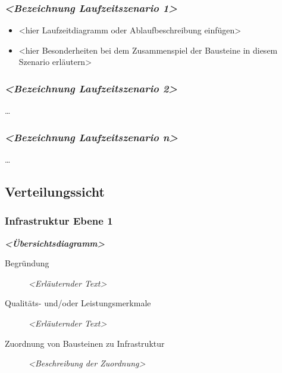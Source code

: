 \subsubsection{\texorpdfstring{\emph{\textless{}Bezeichnung
Laufzeitszenario
1\textgreater{}}}{\textless{}Bezeichnung Laufzeitszenario 1\textgreater{}}}\label{__emphasis_bezeichnung_laufzeitszenario_1_emphasis}

\begin{itemize}
\item
  \textless{}hier Laufzeitdiagramm oder Ablaufbeschreibung
  einfügen\textgreater{}
\item
  \textless{}hier Besonderheiten bei dem Zusammenspiel der Bausteine in
  diesem Szenario erläutern\textgreater{}
\end{itemize}

\subsubsection{\texorpdfstring{\emph{\textless{}Bezeichnung
Laufzeitszenario
2\textgreater{}}}{\textless{}Bezeichnung Laufzeitszenario 2\textgreater{}}}\label{__emphasis_bezeichnung_laufzeitszenario_2_emphasis}

\ldots{}

\subsubsection{\texorpdfstring{\emph{\textless{}Bezeichnung
Laufzeitszenario
n\textgreater{}}}{\textless{}Bezeichnung Laufzeitszenario n\textgreater{}}}\label{__emphasis_bezeichnung_laufzeitszenario_n_emphasis}

\ldots{}

\subsection{Verteilungssicht}\label{section-deployment-view}

\subsubsection{Infrastruktur Ebene 1}\label{_infrastruktur_ebene_1}

\emph{\textbf{\textless{}Übersichtsdiagramm\textgreater{}}}

\begin{description}
\item[Begründung]
\emph{\textless{}Erläuternder Text\textgreater{}}
\item[Qualitäts- und/oder Leistungsmerkmale]
\emph{\textless{}Erläuternder Text\textgreater{}}
\item[Zuordnung von Bausteinen zu Infrastruktur]
\emph{\textless{}Beschreibung der Zuordnung\textgreater{}}
\end{description}


